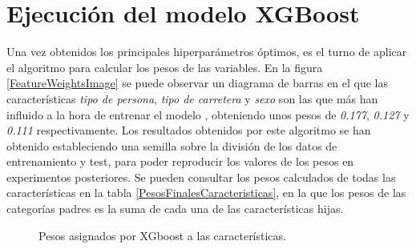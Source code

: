\section{Ejecución del modelo XGBoost}

  Una vez obtenidos los principales hiperparámetros óptimos, es el turno de aplicar el algoritmo  para calcular los pesos de las variables. En la figura \eqref{FeatureWeightsImage} se puede observar un diagrama de barras en el que las características \textit{tipo de persona}, \textit{tipo de carretera} y \textit{sexo} son las que más han influido a la hora de entrenar el modelo , obteniendo unos pesos de \textit{0.177}, \textit{0.127} y \textit{0.111} respectivamente. Los resultados obtenidos por este algoritmo se han obtenido estableciendo una semilla sobre la división de los datos de entrenamiento y test, para poder reproducir los valores de los pesos en experimentos posteriores. Se pueden consultar los pesos calculados de todas las características en la tabla \eqref{PesosFinalesCaracteristicas}, en la que los pesos de las categorías padres es la suma de cada una de las características hijas.


  \begin{figure}[H]
      \centering
      
      \caption{Pesos asignados por XGboost a las características.}
      \label{FeatureWeightsImage}
   \end{figure}



